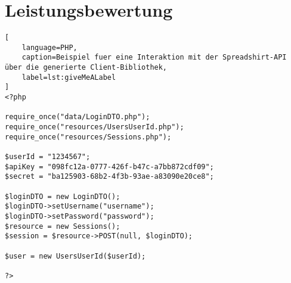 \section{Leistungsbewertung}
\label{sec:performance_measurement}

\begin{lstlisting}[
    language=PHP,
    caption=Beispiel fuer eine Interaktion mit der Spreadshirt-API über die generierte Client-Bibliothek,
    label=lst:giveMeALabel
]
<?php

require_once("data/LoginDTO.php");
require_once("resources/UsersUserId.php");
require_once("resources/Sessions.php");

$userId = "1234567";
$apiKey = "098fc12a-0777-426f-b47c-a7bb872cdf09";
$secret = "ba125903-68b2-4f3b-93ae-a83090e20ce8";

$loginDTO = new LoginDTO();
$loginDTO->setUsername("username");
$loginDTO->setPassword("password");
$resource = new Sessions();
$session = $resource->POST(null, $loginDTO);

$user = new UsersUserId($userId);

?>
\end{lstlisting}

